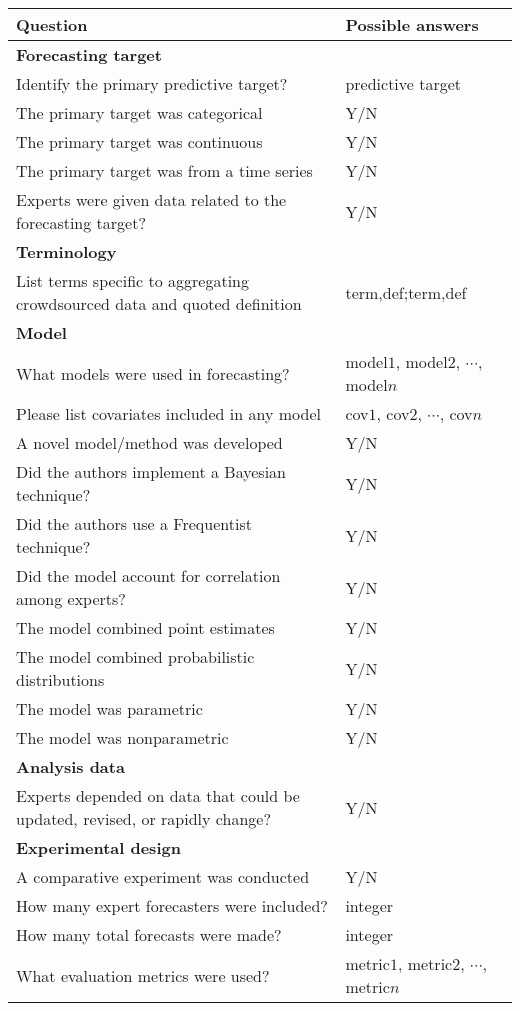 \documentclass[preprint,authoryear]{elsarticle}
\begin{document}
\begin{table}[ht!]
  \begin{tabular}{L{9cm}L{5cm}}
    \hline
    Question & Possible answers\\
    \hline
    \textbf{Forecasting target}\\
    Identify the primary predictive target?      & predictive target\\
    The primary target was categorical           & Y/N \\
    The primary target was continuous            & Y/N \\
    The primary target was from a time series    & Y/N \\
    Experts were given data related to the forecasting target? & Y/N \\

    \textbf{Terminology}\\
    List terms specific to aggregating crowdsourced data and quoted definition & term,def;term,def\\
    
    \textbf{Model}\\
    What models were used in forecasting?        & model$1$, model$2$, $\cdots$, model$n$\\
    Please list covariates included in any model & cov$1$, cov$2$, $\cdots$, cov$n$\\
    A novel model/method was developed                   & Y/N \\
    Did the authors implement a Bayesian technique?      & Y/N \\ 
    Did the authors use a Frequentist technique?         & Y/N\\
    Did the model account for correlation among experts? & Y/N \\
    The model combined point estimates                   & Y/N \\
    The model combined probabilistic distributions       & Y/N \\
    The model was parametric                             & Y/N \\
    The model was nonparametric                          & Y/N \\ 

    \textbf{Analysis data}\\
    Experts depended on data that could be updated, revised, or rapidly change? & Y/N \\
    
    \textbf{Experimental design}\\
    A comparative experiment was conducted               & Y/N\\
    How many expert forecasters were included?           & integer\\
    How many total forecasts were made?                  & integer\\
    What evaluation metrics were used?                   & metric$1$, metric$2$, $\cdots$, metric$n$\\


\end{tabular}
\end{table}
\end{document}
